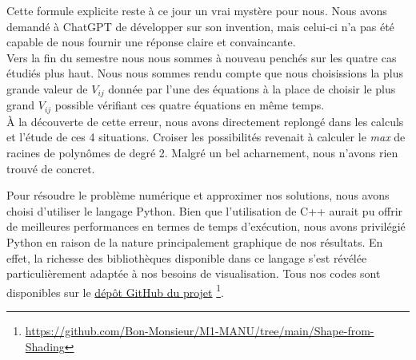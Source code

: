 \begin{noremark}
    Cette formule explicite reste à ce jour un vrai mystère pour nous. Nous avons demandé à ChatGPT de développer sur son \og invention\fg, mais celui-ci n'a pas été capable de nous fournir une réponse claire et convaincante.\\
    Vers la fin du semestre nous nous sommes à nouveau penchés sur les quatre cas étudiés plus haut. Nous nous sommes rendu compte que nous choisissions la plus grande valeur de $V_{ij}$ donnée par l'une des équations à la place de choisir le plus grand $V_{ij}$ possible vérifiant ces quatre équations en même temps. \\
    À la découverte de cette erreur, nous avons directement replongé dans les calculs et l'étude de ces 4 situations. Croiser les possibilités revenait à calculer le \textit{max} de racines de polynômes de degré 2. Malgré un bel acharnement, nous n'avons rien trouvé de concret.
\end{noremark}

Pour résoudre le problème numérique et approximer nos solutions, nous avons choisi d’utiliser le langage Python. Bien que l’utilisation de C++ aurait pu offrir de meilleures performances en termes de temps d’exécution, nous avons privilégié Python en raison de la nature principalement graphique de nos résultats. En effet, la richesse des bibliothèques disponible dans ce langage s'est révélée particulièrement adaptée à nos besoins de visualisation. Tous nos codes sont disponibles sur le \href{https://github.com/Bon-Monsieur/M1-MANU/tree/main/Shape-from-Shading}{dépôt GitHub du projet} \footnote{\href{https://github.com/Bon-Monsieur/M1-MANU/tree/main/Shape-from-Shading}{https://github.com/Bon-Monsieur/M1-MANU/tree/main/Shape-from-Shading}}.

